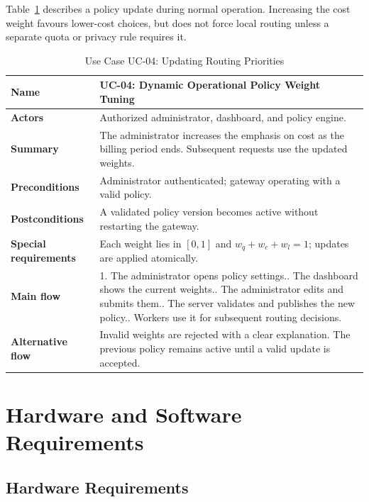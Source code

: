 Table~\ref{tab:uc04} describes a policy update during normal operation. Increasing the cost weight favours lower-cost choices, but does not force local routing unless a separate quota or privacy rule requires it.
\begin{table}[H]
\centering\small
\caption{Use Case UC-04: Updating Routing Priorities}
\label{tab:uc04}
\renewcommand{\arraystretch}{1.08}
\begin{tabularx}{\textwidth}{|p{3.1cm}|X|}
\hline
\textbf{Name} & UC-04: Dynamic Operational Policy Weight Tuning \\ \hline
\textbf{Actors} & Authorized administrator, dashboard, and policy engine. \\ \hline
\textbf{Summary} & The administrator increases the emphasis on cost as the billing period ends. Subsequent requests use the updated weights. \\ \hline
\textbf{Preconditions} & Administrator authenticated; gateway operating with a valid policy. \\ \hline
\textbf{Postconditions} & A validated policy version becomes active without restarting the gateway. \\ \hline
\textbf{Special requirements} & Each weight lies in $[0,1]$ and $w_q+w_c+w_l=1$; updates are applied atomically. \\ \hline
\textbf{Main flow} & 1. The administrator opens policy settings.\newline 2. The dashboard shows the current weights.\newline 3. The administrator edits and submits them.\newline 4. The server validates and publishes the new policy.\newline 5. Workers use it for subsequent routing decisions. \\ \hline
\textbf{Alternative flow} & Invalid weights are rejected with a clear explanation. The previous policy remains active until a valid update is accepted. \\ \hline
\end{tabularx}
\end{table}
\clearpage

\section{Hardware and Software Requirements}
\label{sec:hardware-software-reqs}

\subsection{Hardware Requirements}
\label{subsec:hardware-reqs}

